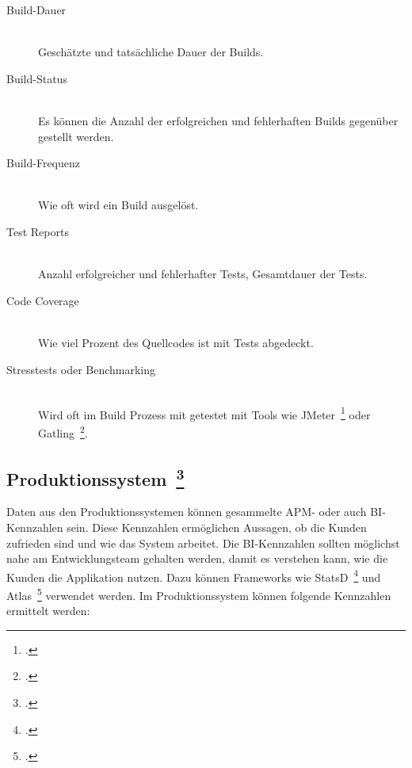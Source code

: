 \begin{description}
  \item[Build-Dauer] \hfill \\ Geschätzte und tatsächliche Dauer der Builds.
  \item[Build-Status] \hfill \\ Es können die Anzahl der erfolgreichen und fehlerhaften Builds gegenüber gestellt werden.
  \item[Build-Frequenz] \hfill \\ Wie oft wird ein Build ausgelöst.
  \item[Test Reports] \hfill \\ Anzahl erfolgreicher und fehlerhafter Tests, Gesamtdauer der Tests.
  \item[Code Coverage] \hfill \\ Wie viel Prozent des Quellcodes ist mit Tests abgedeckt.
  \item[Stresstests oder Benchmarking] \hfill \\ Wird oft im Build Prozess mit getestet mit Tools wie JMeter~\footcite[][]{jmeter} oder Gatling~\footcite[][]{gatling}.
\end{description}

\newpage
\subsection[Produktionssystem]{Produktionssystem~\footcite[vgl.][S.107ff]{davis_agile_2015}}

Daten aus den Produktionssystemen können gesammelte \ac{APM}- oder auch \ac{BI}-Kennzahlen sein.
Diese Kennzahlen ermöglichen Aussagen, ob die Kunden zufrieden sind und wie das System arbeitet.
Die \ac{BI}-Kennzahlen sollten möglichst nahe am Entwicklungsteam gehalten werden, damit es verstehen kann, wie die Kunden die Applikation nutzen.
Dazu können Frameworks wie StatsD~\footcite[][]{statsd} und Atlas~\footcite[][]{atlas} verwendet werden.
Im Produktionssystem können folgende Kennzahlen ermittelt werden:

